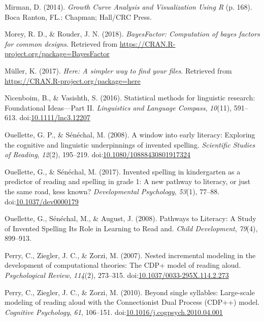 \documentclass[doc,floatsintext]{apa6}
\begin{document}
\hypertarget{ref-Mirman2014}{}
Mirman, D. (2014). \emph{Growth Curve Analysis and Visualization Using
R} (p. 168). Boca Ranton, FL.: Chapman; Hall/CRC Press.

\hypertarget{ref-R-BayesFactor}{}
Morey, R. D., \& Rouder, J. N. (2018). \emph{BayesFactor: Computation of
bayes factors for common designs}. Retrieved from
\url{https://CRAN.R-project.org/package=BayesFactor}

\hypertarget{ref-R-here}{}
Müller, K. (2017). \emph{Here: A simpler way to find your files}.
Retrieved from \url{https://CRAN.R-project.org/package=here}

\hypertarget{ref-Nicenboim2016}{}
Nicenboim, B., \& Vasishth, S. (2016). Statistical methods for
linguistic research: Foundational Ideas---Part II. \emph{Linguistics and
Language Compass}, \emph{10}(11), 591--613.
doi:\href{https://doi.org/10.1111/lnc3.12207}{10.1111/lnc3.12207}

\hypertarget{ref-Ouellette2008b}{}
Ouellette, G. P., \& Sénéchal, M. (2008). A window into early literacy:
Exploring the cognitive and linguistic underpinnings of invented
spelling. \emph{Scientific Studies of Reading}, \emph{12}(2), 195--219.
doi:\href{https://doi.org/10.1080/10888430801917324}{10.1080/10888430801917324}

\hypertarget{ref-Ouellette2017}{}
Ouellette, G., \& Sénéchal, M. (2017). Invented spelling in kindergarten
as a predictor of reading and spelling in grade 1: A new pathway to
literacy, or just the same road, kess known? \emph{Developmental
Psychology}, \emph{53}(1), 77--88.
doi:\href{https://doi.org/10.1037/dev0000179}{10.1037/dev0000179}

\hypertarget{ref-Ouellette2008a}{}
Ouellette, G., Sénéchal, M., \& August, J. (2008). Pathways to Literacy:
A Study of Invented Spelling Its Role in Learning to Read and.
\emph{Child Development}, \emph{79}(4), 899--913.

\hypertarget{ref-Perry2007}{}
Perry, C., Ziegler, J. C., \& Zorzi, M. (2007). Nested incremental
modeling in the development of computational theories: The CDP+ model of
reading aloud. \emph{Psychological Review}, \emph{114}(2), 273--315.
doi:\href{https://doi.org/10.1037/0033-295X.114.2.273}{10.1037/0033-295X.114.2.273}

\hypertarget{ref-Perry2010}{}
Perry, C., Ziegler, J. C., \& Zorzi, M. (2010). Beyond single syllables:
Large-scale modeling of reading aloud with the Connectionist Dual
Process (CDP++) model. \emph{Cognitive Psychology}, \emph{61}, 106--151.
doi:\href{https://doi.org/10.1016/j.cogpsych.2010.04.001}{10.1016/j.cogpsych.2010.04.001}
\end{document}
